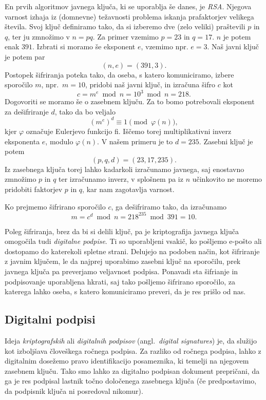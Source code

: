 \documentclass[isrm2, tisk]{fmfdelo}
\begin{document}
\begin{primer}[RSA]
    En prvih algoritmov javnega ključa, ki se uporablja še danes, je \textit{RSA}. Njegova varnost izhaja 
    iz (domnevne) težavnosti problema iskanja prafaktorjev velikega števila. Svoj ključ definiramo tako, 
    da si izberemo dve (zelo veliki) praštevili $p$ in $q$, ter ju zmnožimo v $n = pq$. Za primer vzemimo 
    $p = 23$ in  $q = 17$. $n$ je potem enak $391$. Izbrati si moramo še eksponent $e$, vzemimo npr. $e = 3$. 
    Naš javni ključ je potem par 
    $$ 
    (n, e) = (391, 3).
    $$
    Postopek šifriranja poteka tako, da oseba, s katero komuniciramo, izbere sporočilo $m$, npr.\ 
    $m = 10$, pridobi naš javni ključ, in izračuna šifro $c$ kot
    $$
    c = m^e \bmod{n} = 10^3 \bmod{n} = 218.
    $$
    Dogovoriti se moramo še o zasebnem ključu. Za to bomo potrebovali eksponent za dešifriranje $d$,
    tako da bo veljalo 
    $$
    (m^e)^d \equiv 1 \pmod{\varphi(n)},
    $$ 
    kjer $\varphi$ označuje Eulerjevo funkcijo fi. Iščemo torej multiplikativni inverz eksponenta 
    $e$, modulo $\varphi(n)$. V našem primeru je to $d = 235$. Zasebni ključ je potem 
    $$ 
    (p, q, d) = (23, 17, 235). 
    $$
    Iz zasebnega ključa torej lahko kadarkoli izračunamo javnega, saj enostavno zmnožimo $p$ in $q$ 
    ter izračunamo inverz, v splošnem pa iz $n$ učinkovito ne moremo pridobiti faktorjev $p$ in $q$,
    kar nam zagotavlja varnost.

    Ko prejmemo šifrirano sporočilo $c$, ga dešifriramo tako, da izračunamo
    $$
    m = c^d \bmod{n} = 218^{235} \bmod{391} = 10.   
    $$
\end{primer}

Poleg šifriranja, brez da bi si delili ključ, pa je kriptografija javnega ključa omogočila tudi 
\textit{digitalne podpise}. Ti so uporabljeni vsakič, ko pošljemo e-pošto ali dostopamo do katerekoli 
spletne strani. Delujejo na podoben način, kot šifriranje z javnim ključem, le da najprej uporabimo 
zasebni ključ na sporočilu, prek javnega ključa pa preverjamo veljavnost podpisa. Ponavadi sta šifrianje 
in podpisovanje uporabljena hkrati, saj tako pošljemo šifrirano sporočilo, za katerega lahko oseba,
s katero komuniciramo preveri, da je res prišlo od nas.

\subsection{Digitalni podpisi}
Ideja \textit{kriptografskih} ali \textit{digitalnih podpisov} (angl.\ \textit{digital signatures}) je, 
da služijo kot izboljšava človeškega ročnega podpisa. Za razliko od ročnega podpisa, lahko z digitalnim 
dosežemo pravo identifikacijo posameznika, ki temelji na njegovem zasebnem ključu. Tako smo lahko 
za digitalno podpisan dokument prepričani, da ga je res podpisal lastnik točno določenega zasebnega ključa
(če predpostavimo, da podpisnik ključa ni posredoval nikomur). 
\end{document}
